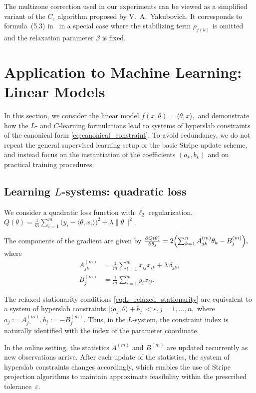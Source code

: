 \documentclass[a4paper,fleqn]{cas-sc}
\begin{document}
The multizone correction used in our experiments
can be viewed as a simplified variant of the $C_\varepsilon$ algorithm
proposed by V.~A.~Yakubovich.
It corresponds to formula~(5.3) in~\cite{Yakubovich1966Recurrent}
in a special case where the stabilizing term $\rho_{j(k)}$ is omitted
and the relaxation parameter $\beta$ is fixed.


\section{Application to Machine Learning: Linear Models}
\label{sec:linear_models}

In this section, we consider the linear model
$
f(x,\theta)=\langle \theta,x\rangle,
$
and demonstrate how the $L$- and $C$-learning formulations lead
to systems of hyperslab constraints of the canonical form
\eqref{eq:canonical_constraint}.
To avoid redundancy, we do not repeat the general supervised learning setup
or the basic Stripe update scheme,
and instead focus on the instantiation of the coefficients $(a_k,b_k)$
and on practical training procedures.


\subsection{Learning $L$-systems: quadratic loss}
\label{sec:l_application}

We consider a quadratic loss function with $\ell_2$ regularization,
$
Q(\theta)=\frac{1}{m}\sum_{i=1}^m\bigl(y_i-\langle \theta,x_i\rangle\bigr)^2
+\lambda\|\theta\|^2.
$

The components of the gradient are given by
$
\frac{\partial Q(\theta)}{\partial \theta_j}
=
2\Bigl(\sum_{k=1}^n A^{(m)}_{jk}\theta_k - B^{(m)}_j\Bigr),
$
where
\begin{align}
A^{(m)}_{jk} &= \frac{1}{m}\sum_{i=1}^m x_{ij}x_{ik} + \lambda\,\delta_{jk},\\
B^{(m)}_j &= \frac{1}{m}\sum_{i=1}^m y_i x_{ij}.
\end{align}

The relaxed stationarity conditions
\eqref{eq:L_relaxed_stationarity}
are equivalent to a system of hyperslab constraints
$
\bigl|\langle a_j,\theta\rangle + b_j\bigr| < \varepsilon, j=1,\dots,n,
$
where
$
a_j := A^{(m)}_{j\cdot}, b_j := -B^{(m)}_j.
$
Thus, in the $L$-system, the constraint index is naturally
identified with the index of the parameter coordinate.

In the online setting, the statistics $A^{(m)}$ and $B^{(m)}$
are updated recurrently as new observations arrive.
After each update of the statistics, the system of hyperslab constraints
changes accordingly, which enables the use of Stripe projection algorithms
to maintain approximate feasibility
within the prescribed tolerance~$\varepsilon$.
\end{document}
